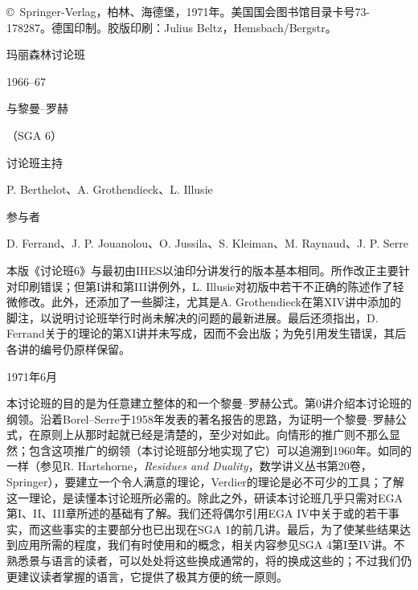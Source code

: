 \copyright\ Springer-Verlag，柏林、海德堡，1971年。美国国会图书馆目录卡号73-178287。德国印制。胶版印刷：Julius Beltz，Hemsbach/Bergstr。
\begin{center}
玛丽森林讨论班\par
1966--67\par\bigskip
{\Large {}与黎曼--罗赫}\par
（SGA 6）\par\bigskip
讨论班主持\par
P. Berthelot、A. Grothendieck、L. Illusie\par\bigskip
参与者\par
D. Ferrand、J. P. Jouanolou、O. Jussila、S. Kleiman、M. Raynaud、J. P. Serre
\end{center}
本版《讨论班6》与最初由IHES以油印分讲发行的版本基本相同。所作改正主要针对印刷错误；但第I讲和第III讲例外，L. Illusie对初版中若干不正确的陈述作了轻微修改。此外，还添加了一些脚注，尤其是A. Grothendieck在第XIV讲中添加的脚注，以说明讨论班举行时尚未解决的问题的最新进展。最后还须指出，D. Ferrand关于的理论的第XI讲并未写成，因而不会出版；为免引用发生错误，其后各讲的编号仍原样保留。
\begin{flushright}1971年6月\end{flushright}
本讨论班的目的是为任意建立整体的和一个黎曼--罗赫公式。第0讲介绍本讨论班的纲领。沿着Borel--Serre于1958年发表的著名报告的思路，为证明一个黎曼--罗赫公式，在原则上从那时起就已经是清楚的，至少对如此。向情形的推广则不那么显然；包含这项推广的纲领（本讨论班部分地实现了它）可以追溯到1960年。如同的一样（参见R. Hartshorne，\textit{Residues and Duality}，数学讲义丛书第20卷，Springer），要建立一个令人满意的理论，Verdier的理论是必不可少的工具；了解这一理论，是读懂本讨论班所必需的。除此之外，研读本讨论班几乎只需对EGA第I、II、III章所述的基础有了解。我们还将偶尔引用EGA IV中关于或的若干事实，而这些事实的主要部分也已出现在SGA 1的前几讲。最后，为了使某些结果达到应用所需的程度，我们有时使用和的概念，相关内容参见SGA 4第I至IV讲。不熟悉景与语言的读者，可以处处将这些换成通常的，将的换成这些的；不过我们仍更建议读者掌握的语言，它提供了极其方便的统一原则。

